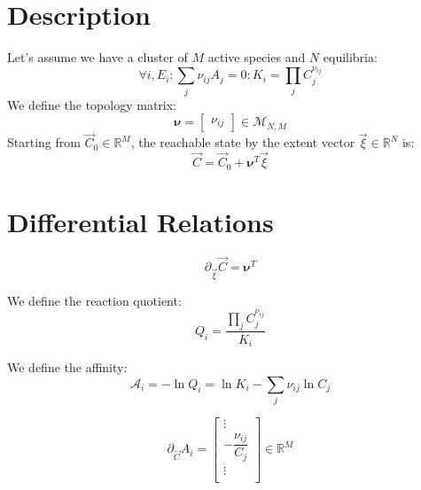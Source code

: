 \documentclass[aps,12pt]{revtex4}
\begin{document}
\section{Description}

Let's assume we have a cluster of $M$ active species and $N$ equilibria:
\begin{equation}
\forall i, E_i : \sum_j \nu_{ij} A_j = 0 : K_i=\prod_j C_j^{\nu_{ij}}
\end{equation}
We define the topology matrix:
\begin{equation}
\bm{\nu} = \begin{bmatrix} \nu_{ij} \end{bmatrix} \in \mathcal{M}_{N,M}
\end{equation}
Starting from $\vec C_0\in \mathbb{R}^M$, the reachable state by the extent vector $\vec \xi \in \mathbb{R}^N$ is:
\begin{equation}
	\vec C = \vec C_0 + \bm{\nu}^T \vec \xi 
\end{equation}

\section{Differential Relations}

\begin{equation}
\partial_{\vec{\xi}} \vec C = \bm{\nu}^T
\end{equation}

We define the reaction quotient:
\begin{equation}
	Q_i = \dfrac{\prod_j C_j^{\nu_{ij}} }{ K_i}
\end{equation}

We define the affinity:
\begin{equation}
	\mathcal A_i = - \ln Q_i = \ln K_i - \sum_j \nu_{ij} \ln C_j
\end{equation}
	
\begin{equation}
\partial_{\vec{C}} A_i = 
\begin{bmatrix}
\vdots\\
-\dfrac{\nu_{ij}}{C_j}\\
\vdots\\
\end{bmatrix} \in \mathbb{R}^M
\end{equation}


\end{document}
